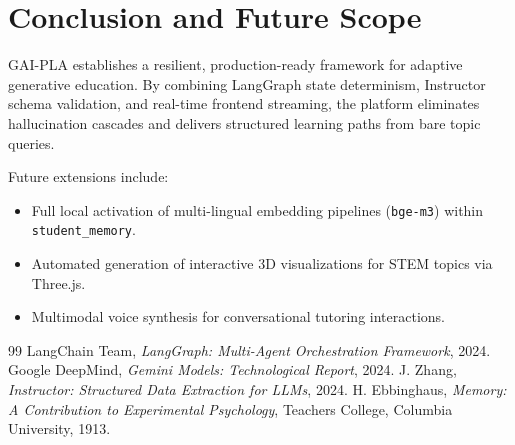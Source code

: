 \documentclass[12pt,a4paper]{article}
\begin{document}
\section{Conclusion and Future Scope}

GAI-PLA establishes a resilient, production-ready framework for adaptive generative education. By combining LangGraph state determinism, Instructor schema validation, and real-time frontend streaming, the platform eliminates hallucination cascades and delivers structured learning paths from bare topic queries.

Future extensions include:
\begin{itemize}
    \item Full local activation of multi-lingual embedding pipelines (\texttt{bge-m3}) within \texttt{student\_memory}.
    \item Automated generation of interactive 3D visualizations for STEM topics via Three.js.
    \item Multimodal voice synthesis for conversational tutoring interactions.
\end{itemize}

\begin{thebibliography}{99}
 LangChain Team, \emph{LangGraph: Multi-Agent Orchestration Framework}, 2024.
 Google DeepMind, \emph{Gemini Models: Technological Report}, 2024.
 J. Zhang, \emph{Instructor: Structured Data Extraction for LLMs}, 2024.
 H. Ebbinghaus, \emph{Memory: A Contribution to Experimental Psychology}, Teachers College, Columbia University, 1913.
\end{thebibliography}
\end{document}
